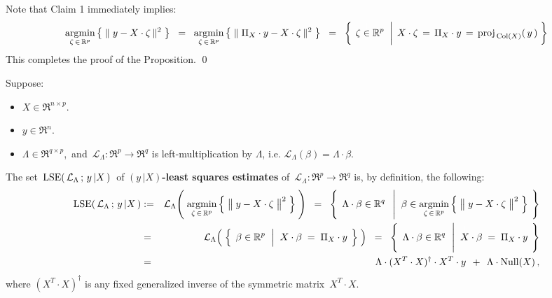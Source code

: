 \vskip 0.5cm
\noindent
Note that Claim 1 immediately implies:
\begin{equation*}
\underset{\zeta\,\in\,\Re^{p}}{\argmin}\left\{\;\Vert\;y - X \cdot \zeta\,\Vert^{2}\;\right\}
\;\; = \;\;
\underset{\zeta\,\in\,\Re^{p}}{\argmin}\left\{\;\Vert\;\Pi_{X} \cdot y - X \cdot \zeta\,\Vert^{2}\;\right\}
\;\; = \;\;
\left\{\;
	\left.
	\zeta \overset{{\color{white}\vert}}{\in} \Re^{p}
	\;\;\right\vert\;
	X \cdot \zeta \,=\, \Pi_{X} \cdot y \,=\, \proj_{\,\Col(X)}(\,y\,)
	\;\right\}
\end{equation*}
This completes the proof of the Proposition.
\qed

\begin{definition}
\mbox{}\vskip 0.1cm\noindent
Suppose:
\begin{itemize}
\item
	$X \in \Re^{n \times p}$.
\item
	$y \in \Re^{n}$.
\item
	$\Lambda \in \Re^{q \times p}$,\,
	and
	\,$\mathcal{L}_{\Lambda} : \Re^{p} \longrightarrow \Re^{q}$ is left-multiplication by $\Lambda$,
	i.e. $\mathcal{L}_{\Lambda}(\beta) = \Lambda \cdot \beta$.
\end{itemize}
The set \,$\textnormal{LSE}\!\left(\,\mathcal{L}_{\Lambda} \,;\, y\,\vert X\,\right)$\,
of \textbf{$(y\,\vert X)$-least squares estimates} of
\,$\mathcal{L}_{\Lambda} : \Re^{p} \longrightarrow \Re^{q}$
is, by definition, the following:
\begin{eqnarray*}
\lse\!\left(\,\mathcal{L}_{\Lambda} \,;\, y\,\vert X\,\right)
&:=&
	\mathcal{L}_{\Lambda}\!\left(\;
		\underset{\zeta\,\in\,\Re^{p}}{\argmin}
		\left\{\;\left\Vert\;\overset{{\color{white}.}}{y} - X\cdot\zeta\;\right\Vert^{2}\;\right\}
		\;\right)
\;\; = \;\;
	\left\{\;\,
		\Lambda\cdot\beta \overset{{\color{white}.}}{\in} \Re^{q}
		\;\;\left\vert\;\;
		\beta \in \underset{\zeta\,\in\,\Re^{p}}{\argmin}
			\left\{\;\left\Vert\;\overset{{\color{white}.}}{y} - X\cdot\zeta\;\right\Vert^{2}\;\right\}
		\right.
		\;\right\}
\\
&=&
	\mathcal{L}_{\Lambda}\!\left(\;
		\left\{\;\,
			\beta \overset{{\color{white}.}}{\in} \Re^{p}
			\;\,\left\vert\;\;
			\overset{{\color{white}.}}{X} \cdot \beta \;=\; \Pi_{X} \cdot y
			\right.
			\;\right\}
		\;\right)
\;\; = \;\;
	\left\{\;\,
		\Lambda\cdot\beta \overset{{\color{white}.}}{\in} \Re^{q}
		\;\,\left\vert\;\;
		\overset{{\color{white}\vert}}{X} \cdot \beta \;=\; \Pi_{X} \cdot y
		\right.
		\;\right\}
\\
&=&
	\Lambda \cdot (X^{T} \cdot X)^{\dagger} \cdot X^{T} \cdot y \;\, + \;\, \Lambda \cdot \Null(X)\,,
\end{eqnarray*}
where $(X^{T} \cdot X)^{\dagger}$ is any fixed generalized inverse
of the symmetric matrix \,$X^{T} \cdot X$.
\end{definition}

